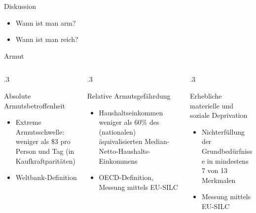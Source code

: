 \documentclass[aspectratio=169,xcolor=dvipsnames]{beamer}
\begin{document}
\begin{frame}{Diskussion}
    \begin{itemize}
        \item Wann ist man arm?
        \item Wann ist man reich?
    \end{itemize}
\end{frame}

\begin{frame}[label = armutsmessung]{Armut}
    \begin{columns}
        \begin{column}{.3\textwidth}
            \begin{block}{Absolute Armutsbetroffenheit}
                \begin{itemize}
                    \item Extreme Armutsschwelle: weniger als \$3 pro Person und Tag (in Kaufkraftparitäten)
                    \item Weltbank-Definition
                \end{itemize}
            \end{block}
        \end{column}

        \pause
        \begin{column}{.3\textwidth}
            \begin{block}{Relative Armutsgefährdung}
                \begin{itemize}
                    \item Haushaltseinkommen weniger als 60\% des (nationalen) äquivalisierten Median-Netto-Haushalts-Einkommens
                    \item OECD-Definition, Messung mittels EU-SILC
                \end{itemize}   
            \end{block}            
        \end{column}

        \pause
        \begin{column}{.3\textwidth}
            \begin{block}{Erhebliche materielle und soziale Deprivation}
                \begin{itemize}
                    \item Nichterfüllung der Grundbedürfnisse in mindestens 7 von 13 Merkmalen
                    \item Messung mittels EU-SILC
                \end{itemize}    
            \end{block}

        \end{column}

    \end{columns}
\end{frame}
\end{document}

